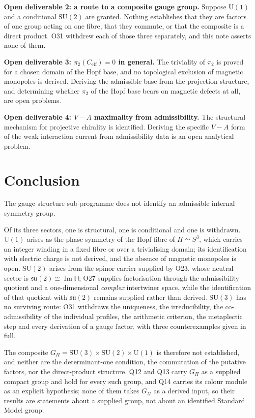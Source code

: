 \documentclass[11pt,a4paper]{article}
\theoremstyle{definition}
\newcommand{\SU}{\mathrm{SU}}
\newcommand{\su}{\mathfrak{su}}
\newcommand{\UU}{\mathrm{U}}
\newcommand{\Gpi}{G_{\Pi}}
\newcommand{\ImH}{\operatorname{Im}\mathbb{H}}
\newcommand{\Ceff}{C_{\mathrm{eff}}}
\begin{document}
    \textbf{Open deliverable 2: a route to a composite gauge group.}
    Suppose $\UU(1)$ and a conditional $\SU(2)$ are granted.
    Nothing establishes that they are factors of one group acting on one fibre, that they commute,
    or that the composite is a direct product.
    O31 withdrew each of those three separately, and this note asserts none of them.

    \textbf{Open deliverable 3: $\pi_2(\Ceff) = 0$ in general.}
    The triviality of $\pi_2$ is proved for a chosen domain of the Hopf base, and no topological
    exclusion of magnetic monopoles is derived.
    Deriving the admissible base from the projection structure, and determining whether $\pi_2$ of
    the Hopf base bears on magnetic defects at all, are open problems.

    \textbf{Open deliverable 4: $V - A$ maximality from admissibility.}
    The structural mechanism for projective chirality is identified.
    Deriving the specific $V - A$ form of the weak interaction current from admissibility data is
    an open analytical problem.

  \section{Conclusion}
    \label{sec:conclusion}

    The gauge structure sub-programme does not identify an admissible internal symmetry group.

    Of its three sectors, one is structural, one is conditional and one is withdrawn.
    $\UU(1)$ arises as the phase symmetry of the Hopf fibre of $\Pi \simeq S^3$, which carries an
    integer winding in a fixed fibre or over a trivialising domain; its identification with electric
    charge is not derived, and the absence of magnetic monopoles is open.
    $\SU(2)$ arises from the spinor carrier supplied by O23, whose neutral sector is
    $\su(2) \cong \ImH$; O27 supplies factorisation through the admissibility quotient and a
    one-dimensional \emph{complex} intertwiner space, while the identification of that quotient with
    $\su(2)$
    remains supplied rather than derived.
    $\SU(3)$ has no surviving route: O31 withdraws the uniqueness, the irreducibility, the
    co-admissibility of the individual profiles, the arithmetic criterion, the metaplectic step and
    every derivation of a gauge factor, with three counterexamples given in full.

    The composite $\Gpi = \SU(3) \times \SU(2) \times \UU(1)$ is therefore not established, and
    neither are the determinant-one condition, the commutation of the putative factors, nor the
    direct-product structure.
    Q12 and Q13 carry $\Gpi$ as a supplied compact group and hold for every such group, and Q14
    carries its colour module as an explicit hypothesis; none of them takes $\Gpi$ as a derived
    input, so their results are statements about a supplied group, not about an identified
    Standard Model group.
\end{document}
